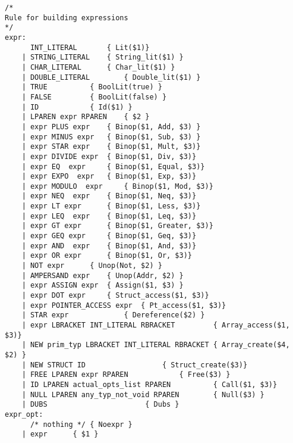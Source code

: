 \documentclass{article}
\begin{document}
\begin{lstlisting}
/* 
Rule for building expressions 
*/
expr:
	  INT_LITERAL 		{ Lit($1)}
	| STRING_LITERAL	{ String_lit($1) }  
	| CHAR_LITERAL 		{ Char_lit($1) }
	| DOUBLE_LITERAL        { Double_lit($1) }
	| TRUE			{ BoolLit(true) }
	| FALSE			{ BoolLit(false) }
	| ID 			{ Id($1) }
	| LPAREN expr RPAREN 	{ $2 }
	| expr PLUS expr 	{ Binop($1, Add, $3) }
	| expr MINUS expr 	{ Binop($1, Sub, $3) }
	| expr STAR expr 	{ Binop($1, Mult, $3)}
	| expr DIVIDE expr 	{ Binop($1, Div, $3)}
	| expr EQ  expr 	{ Binop($1, Equal, $3)}
	| expr EXPO  expr 	{ Binop($1, Exp, $3)}
	| expr MODULO  expr 	{ Binop($1, Mod, $3)}
	| expr NEQ  expr 	{ Binop($1, Neq, $3)}
	| expr LT expr 		{ Binop($1, Less, $3)}
	| expr LEQ  expr 	{ Binop($1, Leq, $3)}
	| expr GT expr 		{ Binop($1, Greater, $3)}
	| expr GEQ expr 	{ Binop($1, Geq, $3)}
	| expr AND  expr 	{ Binop($1, And, $3)}
	| expr OR expr 		{ Binop($1, Or, $3)}
	| NOT expr		{ Unop(Not, $2) }
	| AMPERSAND expr	{ Unop(Addr, $2) }
	| expr ASSIGN expr 	{ Assign($1, $3) }
	| expr DOT expr 	{ Struct_access($1, $3)}
	| expr POINTER_ACCESS expr 	{ Pt_access($1, $3)}
	| STAR expr 			{ Dereference($2) }
	| expr LBRACKET INT_LITERAL RBRACKET 	     { Array_access($1, $3)}
	| NEW prim_typ LBRACKET INT_LITERAL RBRACKET { Array_create($4, $2) }
	| NEW STRUCT ID 			     { Struct_create($3)}
	| FREE LPAREN expr RPAREN		     { Free($3) }
	| ID LPAREN actual_opts_list RPAREN          { Call($1, $3)}
	| NULL LPAREN any_typ_not_void RPAREN 	     { Null($3) }
 	| DUBS					     { Dubs }
expr_opt:
	  /* nothing */ { Noexpr }
	| expr 		{ $1 }
\end{lstlisting}
\newpage
\end{document}
